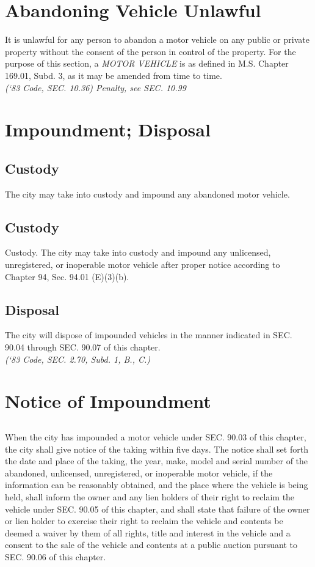 \section{Abandoning Vehicle Unlawful}
It is unlawful for any person to abandon a motor vehicle on any public or private property without the consent of the person in control of the property.  For the purpose of this section, a \emph{MOTOR VEHICLE} is as defined in M.S. Chapter 169.01, Subd. 3, as it may be amended from time to time.\\
\emph{(‘83 Code, SEC. 10.36)  Penalty, see SEC. 10.99}

\section{Impoundment; Disposal}
\subsection{Custody}
The city may take into custody and impound any abandoned motor vehicle.
\subsection{Custody}
Custody.  The city may take into custody and impound any unlicensed, unregistered, or inoperable motor vehicle after proper notice according to Chapter 94, Sec. 94.01 (E)(3)(b).
\subsection{Disposal}
The city will dispose of impounded vehicles in the manner indicated in SEC. 90.04 through SEC. 90.07 of this chapter.\\
\emph{(‘83 Code, SEC. 2.70, Subd. 1, B., C.)}

\section{Notice of Impoundment}
\subsection{}
When the city has impounded a motor vehicle under SEC. 90.03 of this chapter, the city shall give notice of the taking within five days.  The notice shall set forth the date and place of the taking, the year, make, model and serial number of the abandoned, unlicensed, unregistered, or inoperable motor vehicle, if the information can be reasonably obtained, and the place where the vehicle is being held, shall inform the owner and any lien holders of their right to reclaim the vehicle under SEC. 90.05 of this chapter, and shall state that failure of the owner or lien holder to exercise their right to reclaim the vehicle and contents be deemed a waiver by them of all rights, title and interest in the vehicle and a consent to the sale of the vehicle and contents at a public auction pursuant to SEC. 90.06 of this chapter.
